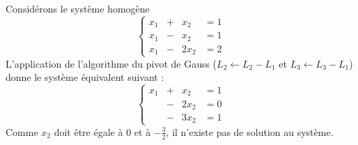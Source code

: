 \documentclass[a4paper]{book}
\begin{document}
\begin{Exemple}
 Considérons le système homogène
$$\left\{\begin{matrix}
x_1 &+& x_2  &= 1\\
x_1 &-& x_2  &= 1\\
x_1 &-& 2x_2 &=2
     \end{matrix}
\right.$$
L'application de l'algorithme du pivot de Gauss ($L_2\leftarrow L_2-L_1$ et $L_3\leftarrow L_3-L_1$) donne le système équivalent suivant :
$$\left\{\begin{matrix}
x_1 &+& x_2  &= 1\\
 &-& 2x_2  &= 0\\
 &-& 3x_2 &=1
     \end{matrix}
\right.$$
Comme $x_2$ doit être égale à $0$ et à $-\frac 3 2$, il n'existe pas de solution au système.
\end{Exemple}
\end{document}
